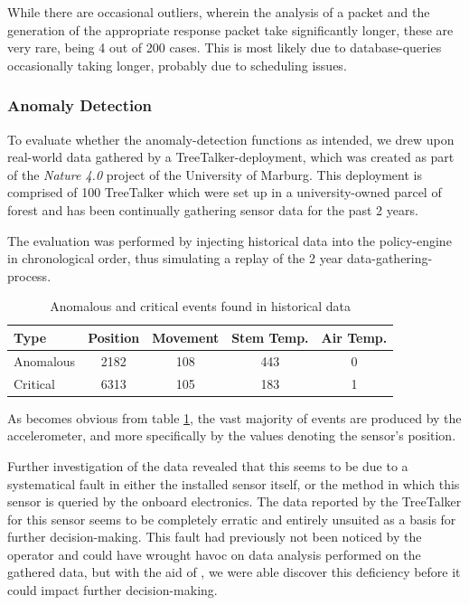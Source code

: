 While there are occasional outliers, wherein the analysis of a packet and the generation of the appropriate response packet take significantly longer, these are very rare, being 4 out of 200 cases.
This is most likely due to database-queries occasionally taking longer, probably due to scheduling issues.

\subsubsection{Anomaly Detection}
\label{sec:evaluation:anomaly-detection}

To evaluate whether the anomaly-detection functions as intended, we drew upon real-world data gathered by a TreeTalker-deployment, which was created as part of the \textit{Nature 4.0} project of the University of Marburg.
This deployment is comprised of 100 TreeTalker which were set up in a university-owned parcel of forest and has been continually gathering sensor data for the past 2 years.

The evaluation was performed by injecting historical data into the policy-engine in chronological order, thus simulating a replay of the 2 year data-gathering-process.

\begin{table}[tb]
    \centering
    \caption{Anomalous and critical events found in historical data}
    \label{tab:evaluation:anomalies}
    \begin{tabular}{lcccc}
        \toprule
        Type & Position & Movement & Stem Temp. & Air Temp.  \\ \midrule
        Anomalous & 2182 & 108 & 443 & 0 \\
        Critical & 6313 & 105 & 183 & 1 \\
        \bottomrule
    \end{tabular}
\end{table}

As becomes obvious from table \ref{tab:evaluation:anomalies}, the vast majority of events are produced by the accelerometer, and more specifically by the values denoting the sensor's position.

Further investigation of the data revealed that this seems to be due to a systematical fault in either the installed sensor itself, or the method in which this sensor is queried by the onboard electronics.
The data reported by the TreeTalker for this sensor seems to be completely erratic and entirely unsuited as a basis for further decision-making.
This fault had previously not been noticed by the operator and could have wrought havoc on data analysis performed on the gathered data, but with the aid of \ttt, we were able discover this deficiency before it could impact further decision-making.

